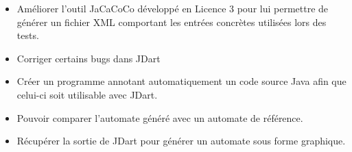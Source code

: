 \begin{itemize}
\item Améliorer l'outil JaCaCoCo développé en Licence 3 pour lui
  permettre de générer un fichier XML comportant les entrées concrètes
  utilisées lors des tests.
\item Corriger certains bugs dans JDart
\item Créer un programme annotant automatiquement un code source Java
  afin que celui-ci soit utilisable avec JDart.
\item Pouvoir comparer l'automate généré avec un automate de
  référence.
\item Récupérer la sortie de JDart pour générer un automate sous forme
  graphique.
\end{itemize}